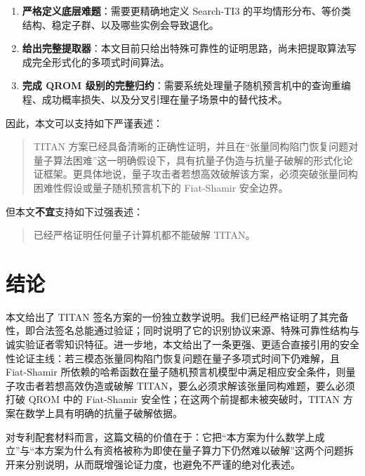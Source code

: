 \documentclass[12pt,a4paper]{article}
\theoremstyle{remark}
\begin{document}
\begin{enumerate}
    \item \textbf{严格定义底层难题}：需要更精确地定义 Search-TI3 的平均情形分布、等价类结构、稳定子群、以及哪些实例会导致退化。
    \item \textbf{给出完整提取器}：本文目前只给出特殊可靠性的证明思路，尚未把提取算法写成完全形式化的多项式时间算法。
    \item \textbf{完成 QROM 级别的完整归约}：需要系统处理量子随机预言机中的查询重编程、成功概率损失、以及分叉引理在量子场景中的替代技术。
\end{enumerate}

因此，本文可以支持如下严谨表述：
\begin{quote}
TITAN 方案已经具备清晰的正确性证明，并且在“张量同构陷门恢复问题对量子算法困难”这一明确假设下，具有抗量子伪造与抗量子破解的形式化论证框架。更具体地说，量子攻击者若想高效破解该方案，必须突破张量同构困难性假设或量子随机预言机下的 Fiat-Shamir 安全边界。
\end{quote}

但本文\textbf{不宜}支持如下过强表述：
\begin{quote}
已经严格证明任何量子计算机都不能破解 TITAN。
\end{quote}

\section{结论}

本文给出了 TITAN 签名方案的一份独立数学说明。我们已经严格证明了其完备性，即合法签名总能通过验证；同时说明了它的识别协议来源、特殊可靠性结构与诚实验证者零知识特征。进一步地，本文给出了一条更强、更适合直接引用的安全性论证主线：若三模态张量同构陷门恢复问题在量子多项式时间下仍难解，且 Fiat-Shamir 所依赖的哈希函数在量子随机预言机模型中满足相应安全条件，则量子攻击者若想高效伪造或破解 TITAN，要么必须求解该张量同构难题，要么必须打破 QROM 中的 Fiat-Shamir 安全性；在这两个前提都未被突破时，TITAN 方案在数学上具有明确的抗量子破解依据。

对专利配套材料而言，这篇文稿的价值在于：它把“本方案为什么数学上成立”与“本方案为什么有资格被称为即使在量子算力下仍然难以破解”这两个问题拆开来分别说明，从而既增强论证力度，也避免不严谨的绝对化表述。
\end{document}
